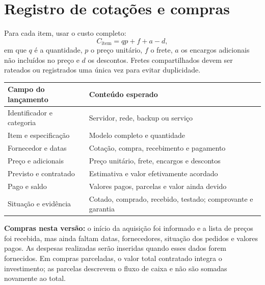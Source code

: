 \documentclass[11pt,a4paper,oneside]{report}
\begin{document}
\section{Registro de cotações e compras}
Para cada item, usar o custo completo:
\begin{equation}
C_{\mathrm{item}} = q p + f + a - d,
\end{equation}
em que $q$ é a quantidade, $p$ o preço unitário, $f$ o frete, $a$ os encargos
adicionais não incluídos no preço e $d$ os descontos. Fretes compartilhados
devem ser rateados ou registrados uma única vez para evitar duplicidade.

\begin{tabularx}{\textwidth}{@{}p{3.7cm}Y@{}}
\toprule
Campo do lançamento & Conteúdo esperado \\
\midrule
Identificador e categoria & Servidor, rede, backup ou serviço \\
Item e especificação & Modelo completo e quantidade \\
Fornecedor e datas & Cotação, compra, recebimento e pagamento \\
Preço e adicionais & Preço unitário, frete, encargos e descontos \\
Previsto e contratado & Estimativa e valor efetivamente acordado \\
Pago e saldo & Valores pagos, parcelas e valor ainda devido \\
Situação e evidência & Cotado, comprado, recebido, testado; comprovante e garantia \\
\bottomrule
\end{tabularx}

\textbf{Compras nesta versão:} o início da aquisição foi informado e a lista
de preços foi recebida, mas ainda faltam datas, fornecedores, situação dos
pedidos e valores pagos. As despesas realizadas serão inseridas quando esses
dados forem fornecidos. Em compras parceladas, o valor total contratado
integra o investimento; as parcelas descrevem o fluxo de caixa e não são somadas
novamente ao total.
\end{document}
